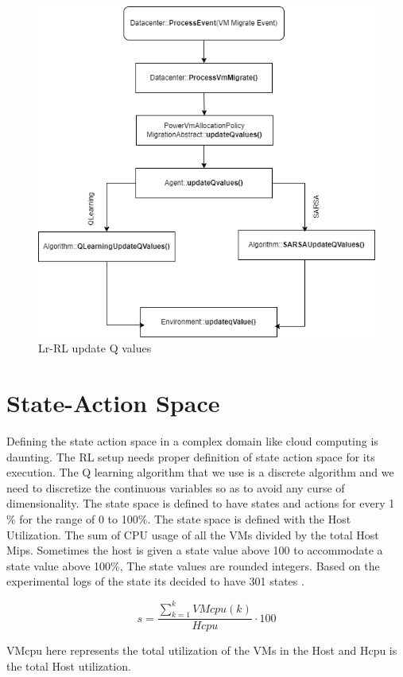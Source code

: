 \documentclass[a4paper,12pt]{Classes/RoboticsLaTeX}
\begin{document}
       \begin{figure}[H]
           \centering
           \includegraphics[width=0.75\linewidth]{Figures/UpdateProcess.png}
           \caption{Lr-RL update Q values}
           \label{fig:enter-label}
       \end{figure}

       \section{State-Action Space}
       Defining the state action space in a complex domain like cloud computing is daunting. The RL setup needs proper definition of state action space for its execution. The Q learning algorithm that we use is a discrete algorithm and we need to discretize the continuous variables so as to avoid any curse of dimensionality. The state space is defined to have states and actions for every 1 \% for the range of 0 to 100\%. The state space is defined with the Host Utilization. The sum of CPU usage of all the VMs divided by the total Host Mips. Sometimes the host is given a state value above 100 to accommodate a state value above 100\%, The state values are rounded integers. Based on the experimental logs of the state its decided to have 301 states .\cite{Lukethesis}

      \begin{equation}
       s = \frac{\sum_{k=1}^{k} VMcpu(k)}{Hcpu} \cdot 100
      \end{equation}

      VMcpu here represents the total utilization of the VMs in the Host and Hcpu is the total Host utilization.
      
\end{document}
